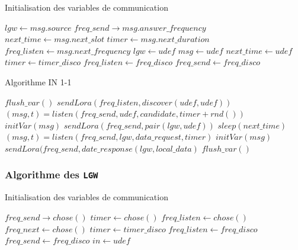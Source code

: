 \documentclass[11pt]{article}
\begin{document}
\begin{algorithm}
\caption{Initialisation des variables de communication}\label{alg:intvar}
\begin{algorithmic}[1]
\State $lgw \leftarrow msg.source$
\State $freq\_send \rightarrow msg.answer\_frequency$
\State $next\_time \leftarrow msg.next\_slot$
\State $timer \leftarrow msg.next\_duration$
\State $freq\_listen \leftarrow msg.next\_frequency$
\EndProcedure
\State
{}
\State $lgw \leftarrow udef$
\State $msg \leftarrow udef$
\State $next\_time \leftarrow udef$
\State $timer \leftarrow timer\_disco$
\State $freq\_listen \leftarrow freq\_disco$
\State $freq\_send \leftarrow freq\_disco$
\EndProcedure
\end{algorithmic}
\end{algorithm}


\begin{algorithm}
\caption{Algorithme IN 1-1}\label{alg:in1-1}
\begin{algorithmic}[1]
  \State $flush\_var()$
  \State {}
    \State $sendLora(freq\_listen,discover(udef,udef))$
    \State $(msg,t) = listen(freq\_send,udef,candidate,timer + rnd())$
  \EndWhile
  \State $initVar(msg)$
  \State $sendLora(freq\_send,pair(lgw,udef))$
  \State
  \State {}
    \State $sleep(next\_time)$
    \State $(msg,t) = listen(freq\_send,lgw,data\_request,timer)$
      \State $initVar(msg)$
      \State $sendLora(freq\_send,date\_response(lgw,local\_data)$
    \Else
      $flush\_var()$
    \EndIf
  \EndWhile
\EndWhile
\end{algorithmic}
\end{algorithm}

\subsubsection{Algorithme des \texttt{LGW}}

\begin{algorithm}
\caption{Initialisation des variables de communication}\label{alg:initvarlg}
\begin{algorithmic}[1]
\State $freq\_send \rightarrow chose()$
\State $timer \leftarrow chose()$
\State $freq\_listen \leftarrow chose()$
\State $freq\_next \leftarrow chose()$
\EndProcedure
\State
{}
\State $timer \leftarrow timer\_disco$
\State $freq\_listen \leftarrow freq\_disco$
\State $freq\_send \leftarrow freq\_disco$
\State $in \leftarrow udef$
\EndProcedure
\end{algorithmic}
\end{algorithm}
\end{document}
